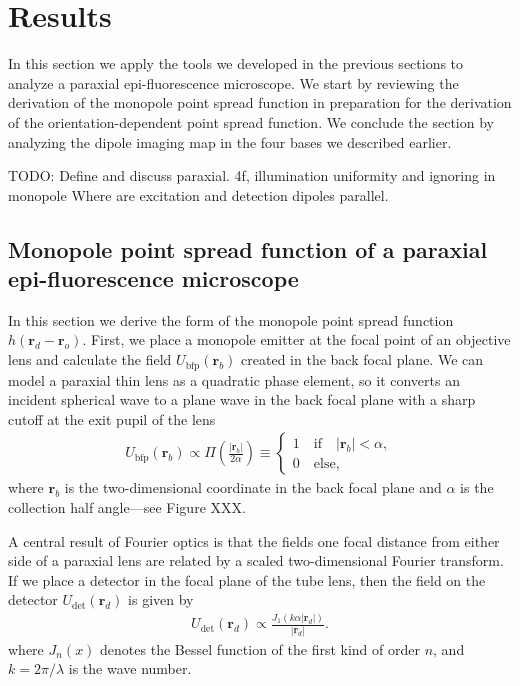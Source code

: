 \documentclass[]{osa-article}
\providecommand{\mb}[1]{\mathbf{#1}}
\providecommand{\ro}{\mathbf{\mathbf{r}}_o}
\providecommand{\rb}{\mathbf{r}_b}
\providecommand{\rd}{\mathbf{r}_d}
\begin{document}
    
\section{Results}\label{sec:results}
In this section we apply the tools we developed in the previous sections to
analyze a paraxial epi-fluorescence microscope. We start by reviewing the
derivation of the monopole point spread function in preparation for the
derivation of the orientation-dependent point spread function. We conclude the
section by analyzing the dipole imaging map in the four bases we described
earlier.

TODO: Define and discuss paraxial. 4f, illumination uniformity and ignoring in
monopole Where are excitation and detection dipoles parallel.

\subsection{Monopole point spread function of a paraxial epi-fluorescence microscope}
In this section we derive the form of the monopole point spread function
$h(\rd - \ro)$. First, we place a monopole emitter at the focal point of an
objective lens and calculate the field $U_{\text{bfp}}(\rb)$ created in the back
focal plane. We can model a paraxial thin lens as a quadratic phase element, so
it converts an incident spherical wave to a plane wave in the back focal plane
with a sharp cutoff at the exit pupil of the lens
\begin{align}
  U_{\text{bfp}}(\mb{r}_b) \propto \Pi\left(\frac{|\mb{r}_b|}{2\alpha}\right) \equiv
  \begin{cases}
    1\quad \text{if}\quad |\mb{r}_b| < \alpha,\\
    0\quad \text{else},
  \end{cases}
\end{align}
where $\rb$ is the two-dimensional coordinate in the back focal plane and
$\alpha$ is the collection half angle---see Figure XXX. 

A central result of Fourier optics is that the fields one focal distance from
either side of a paraxial lens are related by a scaled two-dimensional Fourier
transform. If we place a detector in the focal plane of the tube lens, then the
field on the detector $U_{\text{det}}(\mb{r}_d)$ is given by
\begin{align}
  U_{\text{det}}(\mb{r}_d) \propto \frac{J_1(k\alpha|\mb{r}_d|)}{|\mb{r}_d|}.
\end{align}
where $J_n(x)$ denotes the Bessel function of the first kind of order $n$, and
$k = 2\pi/\lambda$ is the wave number.
\end{document}
